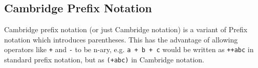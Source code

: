 \subsection*{Cambridge Prefix Notation}

Cambridge prefix notation (or just Cambridge notation) is a variant of Prefix notation which introduces parentheses. This
 has the advantage of allowing operators like \verb`+` and \verb`-` to be n-ary, e.g. \verb`a + b + c` would be written
 as \verb`++abc` in standard prefix notation, but as \verb`(+abc)` in Cambridge notation.

